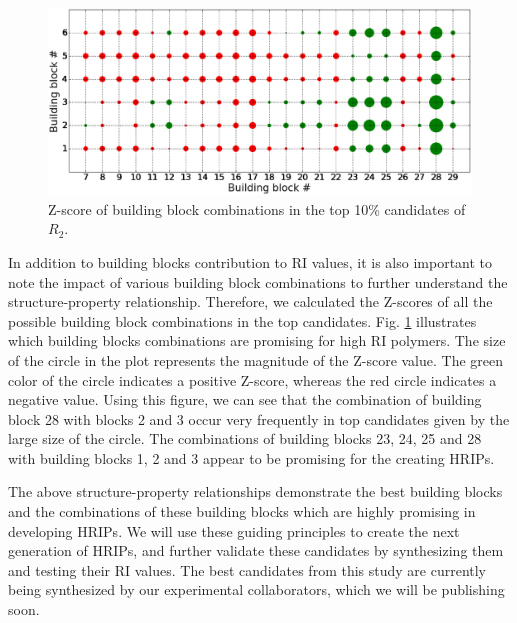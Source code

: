 
\begin{figure}[htbp] 
	\centering
	\includegraphics[width=1.00\textwidth]{Chapter-5/Figures/Bonds_top_Z.eps}
	\caption{Z-score of building block combinations in the top 10\% candidates of $R_2$.} 
	\label{fig:Bonds_top_Z} 
\end{figure}  

In addition to building blocks contribution to RI values, it is also important to note the impact of various building block combinations to further understand the structure-property relationship. Therefore, we calculated the Z-scores of all the possible building block combinations in the top candidates. Fig. \ref{fig:Bonds_top_Z} illustrates which building blocks combinations are promising for high RI polymers. The size of the circle in the plot represents the magnitude of the Z-score value. The green color of the circle indicates a positive Z-score, whereas the red circle indicates a negative value. Using this figure, we can see that the combination of building block 28 with blocks 2 and 3 occur very frequently in top candidates given by the large size of the circle. The combinations of building blocks 23, 24, 25 and 28 with building blocks 1, 2 and 3 appear to be promising for the creating HRIPs. 

The above structure-property relationships demonstrate the best building blocks and the combinations of these building blocks which are highly promising in developing HRIPs. We will use these guiding principles to create the next generation of HRIPs, and further validate these candidates by synthesizing them and testing their RI values. The best candidates from this study are currently being synthesized by our experimental collaborators, which we will be publishing soon.

